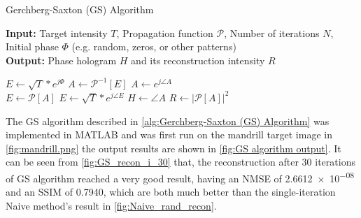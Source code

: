 \begin{algorithm}[H]
  \caption{Gerchberg-Saxton (GS) Algorithm}\label{alg:Gerchberg-Saxton (GS) Algorithm}
  \textbf{Input:} Target intensity $T$, Propagation function $\mathcal{P}$, Number of iterations $N$, Initial phase $\varPhi$ (e.g. random, zeros, or other patterns) \\
  \textbf{Output:} Phase hologram $H$ and its reconstruction intensity $R$
  \begin{algorithmic}
    \State $E \gets \sqrt{T} * e^{j\varPhi}$
    \State $A \gets \mathcal{P}^{-1}[E]$
    \State $A \gets e^{j\angle A}$\\
    \State $E \gets \mathcal{P}[A]$
    \State $E \gets \sqrt{T} * e^{j\angle E}$
    \EndFor
    \State $H \gets \angle A$
    \State $R \gets \vert \mathcal{P}[A] \vert ^2$
  \end{algorithmic}
\end{algorithm}

The GS algorithm described in \cref{alg:Gerchberg-Saxton (GS) Algorithm} was implemented in MATLAB and was first run on the mandrill target image in \cref{fig:mandrill.png} the output results are shown in \cref{fig:GS algorithm output}. It can be seen from \cref{fig:GS_recon_i_30} that, the reconstruction after 30 iterations of GS algorithm reached a very good result, having an NMSE of \num{2.6612e-08} and an SSIM of 0.7940, which are both much better than the single-iteration Naive method's result in \cref{fig:Naive_rand_recon}.

